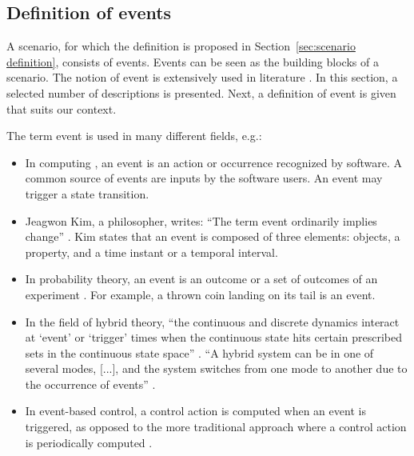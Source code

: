 \subsection{Definition of events}
\label{sec:events}
A scenario, for which the definition is proposed in Section~\ref{sec:scenario definition}, consists of events. Events can be seen as the building blocks of a scenario. The notion of event is extensively used in literature \cite{breu1997towards, 
	kim1993supervenience, pfeiffer2013concepts, branicky1998hybridcontrol, %
	deschutter2000optimal, heemels2012eventcontrol}. In this section, a selected number of descriptions is presented. Next, a definition of event is given that suits our context.

The term event is used in many different fields, e.g.:
\begin{itemize}
	\item In computing \cite{breu1997towards}, an event is an action or occurrence recognized by software. A common source of events are inputs by the software users. An event may trigger a state transition.
	\item Jeagwon Kim, a philosopher, writes: ``The term event ordinarily implies change'' \cite{kim1993supervenience}. Kim states that an event is composed of three elements: objects, a property, and a time instant or a temporal interval. 
	\item In probability theory, an event is an outcome or a set of outcomes of an experiment \cite{pfeiffer2013concepts}. For example, a thrown coin landing on its tail is an event.
	\item In the field of hybrid theory, ``the continuous and discrete dynamics interact at `event' or `trigger' times when the continuous state hits certain prescribed sets in the continuous state space'' \cite{branicky1998hybridcontrol}. ``A hybrid system can be in one of several modes, [...], and the system switches from one mode to another due to the occurrence of events'' \cite{deschutter2000optimal}.
	\item In event-based control, a control action is computed when an event is triggered, as opposed to the more traditional approach where a control action is periodically computed \cite{heemels2012eventcontrol}. 
\end{itemize}

